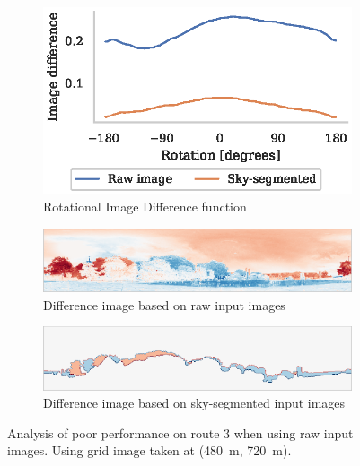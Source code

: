\documentclass[letterpaper]{article}
\begin{document}
\begin{figure}[t]
    \begin{subfigure}[b]{\columnwidth}
        \includegraphics[width=\columnwidth]{figures/route3_ridf.eps}
        \caption{Rotational Image Difference function}
        \label{fig:light_level/ridf}
    \end{subfigure}
    
    \begin{subfigure}[b]{\columnwidth}
        \includegraphics[width=\columnwidth]{figures/route3_unwrapped_image_diff.png}
        \caption{Difference image based on raw input images}
        \label{fig:light_level/raw_image_diff}
    \end{subfigure}
    
    \begin{subfigure}[b]{\columnwidth}
        \includegraphics[width=\columnwidth]{figures/route3_mask_image_diff.png}
        \caption{Difference image based on sky-segmented input images}
        \label{fig:light_level/sky_segmented_image_diff}
    \end{subfigure}
    \caption{Analysis of poor performance on route 3 when using raw input images.
    Using grid image taken at (\SI{480}{\metre}, \SI{720}{\metre}).}
    \label{fig:light_level}
\end{figure}
\end{document}

